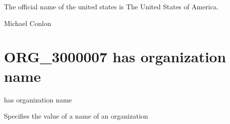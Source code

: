 \documentclass[letterpaper,10pt,english]{sphinxmanual}
\begin{document}
\begin{sphinxShadowBox}

\sphinxAtStartPar
{}
\end{sphinxShadowBox}

\begin{sphinxShadowBox}

\sphinxAtStartPar
The official name of the united states is The United States of America.
\end{sphinxShadowBox}

\begin{sphinxShadowBox}

\sphinxAtStartPar
Michael Conlon 
\end{sphinxShadowBox}
\begin{quote}

\ignorespaces \end{quote}


\section{ORG\_3000007 \sphinxhyphen{} has organization name}
\label{\detokenize{doc-ORG_3000007:org-3000007-has-organization-name}}\label{\detokenize{doc-ORG_3000007:index-0}}\label{\detokenize{doc-ORG_3000007::doc}}
\begin{sphinxShadowBox}

\sphinxAtStartPar
has organization name
\end{sphinxShadowBox}

\begin{sphinxShadowBox}

\sphinxAtStartPar
{}
\end{sphinxShadowBox}

\begin{sphinxShadowBox}

\sphinxAtStartPar
Specifies the value of a name of an organization
\end{sphinxShadowBox}
\end{document}
